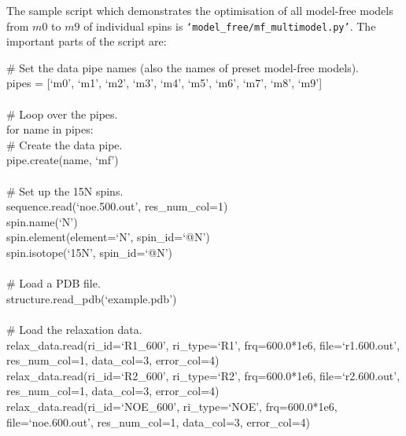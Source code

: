 \begin{htmlonly}
\begin{htmlonly}
The sample script which demonstrates the optimisation of all model-free models from $m0$ to $m9$ of individual spins is \texttt{`model\_free/mf\_multimodel.py'}.  The important parts of the script are:

\begin{exampleenv}
\# Set the data pipe names (also the names of preset model-free models). \\
pipes = [`m0', `m1', `m2', `m3', `m4', `m5', `m6', `m7', `m8', `m9'] \\
 \\
\# Loop over the pipes. \\
for name in pipes: \\
\hspace*{4ex} \# Create the data pipe. \\
\hspace*{4ex} pipe.create(name, `mf') \\
 \\
\hspace*{4ex} \# Set up the 15N spins. \\
\hspace*{4ex} sequence.read(`noe.500.out', res\_num\_col=1) \\
\hspace*{4ex} spin.name(`N') \\
\hspace*{4ex} spin.element(element=`N', spin\_id=`@N') \\
\hspace*{4ex} spin.isotope(`15N', spin\_id=`@N') \\
 \\
\hspace*{4ex} \# Load a PDB file. \\
\hspace*{4ex} structure.read\_pdb(`example.pdb') \\
 \\
\hspace*{4ex} \# Load the relaxation data. \\
\hspace*{4ex} relax\_data.read(ri\_id=`R1\_600',  ri\_type=`R1',  frq=600.0*1e6, file=`r1.600.out', res\_num\_col=1, data\_col=3, error\_col=4) \\
\hspace*{4ex} relax\_data.read(ri\_id=`R2\_600',  ri\_type=`R2',  frq=600.0*1e6, file=`r2.600.out', res\_num\_col=1, data\_col=3, error\_col=4) \\
\hspace*{4ex} relax\_data.read(ri\_id=`NOE\_600', ri\_type=`NOE', frq=600.0*1e6, file=`noe.600.out', res\_num\_col=1, data\_col=3, error\_col=4) \\

\end{exampleenv}
\end{htmlonly}
\end{htmlonly}
